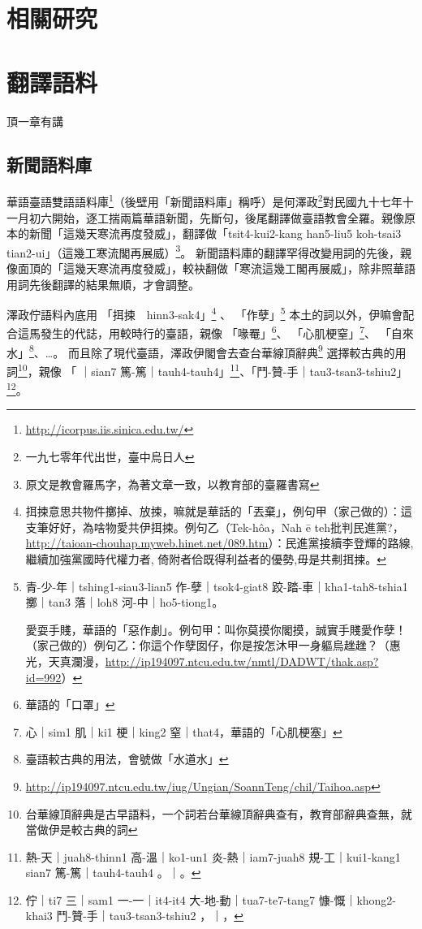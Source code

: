 \documentclass[final,oneside,onecolumn,12pt,a4paper]{book}%
\begin{document}
\chapter{相關研究}
\label{章：相關研究}


\chapter{翻譯語料}
\label{章：翻譯語料}

頂一章有講

\section{新聞語料庫}
\label{節：新聞語料庫}
華語臺語雙語語料庫\footnote{\url{http://icorpus.iis.sinica.edu.tw/}}（後壁用「新聞語料庫」稱呼）是何澤政\footnote{一九七零年代出世，臺中烏日人}對民國九十七年十一月初六開始，逐工揣兩篇華語新聞，先斷句，後尾翻譯做臺語教會全羅。親像原本的新聞「這幾天寒流再度發威」，翻譯做「tsit4-kui2-kang han5-liu5 koh-tsai3 tian2-ui」（這幾工寒流閣再展威）\footnote{原文是教會羅馬字，為著文章一致，以教育部的臺羅書寫}。
新聞語料庫的翻譯罕得改變用詞的先後，親像面頂的「這幾天寒流再度發威」，較袂翻做「寒流這幾工閣再展威」，除非照華語用詞先後翻譯的結果無順，才會調整。

澤政佇語料內底用
「挕捒　hinn3-sak4」\footnote{挕捒意思共物件擲掉、放捒，嘛就是華話的「丟棄」，例句甲（家己做的）：這支筆好好，為啥物愛共伊挕捒。例句乙（Tek-hôa，Nah ē teh批判民進黨?，\url{http://taioan-chouhap.myweb.hinet.net/089.htm}）：民進黨接續李登輝的路線, 繼續加強黨國時代權力者, 倚附者佮既得利益者的優勢,毋是共刜挕捒。}
、
「作孽」\footnote{
青-少-年｜tshing1-siau3-lian5 作-孽｜tsok4-giat8 跤-踏-車｜kha1-tah8-tshia1 擲｜tan3 落｜loh8 河-中｜ho5-tiong1。

愛耍手賤，華語的「惡作劇」。例句甲：叫你莫摸你閣摸，誠實手賤愛作孽！（家己做的）例句乙：你這个作孽囡仔，你是按怎沐甲一身軀烏趖趖？（惠光，天真瀾漫，\url{http://ip194097.ntcu.edu.tw/nmtl/DADWT/thak.asp?id=992}）}
本土的詞以外，伊嘛會配合這馬發生的代誌，用較時行的臺語，親像
「喙罨」\footnote{華語的「口罩」}、
「心肌梗窒」\footnote{心｜sim1 肌｜ki1 梗｜king2 窒｜that4，華語的「心肌梗塞」}、
「自來水」\footnote{臺語較古典的用法，會號做「水道水」}、…。
而且除了現代臺語，澤政伊閣會去查台華線頂辭典\footnote{\url{http://ip194097.ntcu.edu.tw/iug/Ungian/SoannTeng/chil/Taihoa.asp}}
選擇較古典的用詞\footnote{台華線頂辭典是古早語料，一个詞若台華線頂辭典查有，教育部辭典查無，就當做伊是較古典的詞}，親像
「𤺪｜sian7 篤-篤｜tauh4-tauh4」\footnote{熱-天｜juah8-thinn1 高-溫｜ko1-un1 炎-熱｜iam7-juah8 規-工｜kui1-kang1 𤺪｜sian7 篤-篤｜tauh4-tauh4 。｜。}、「鬥-贊-手｜tau3-tsan3-tshiu2」\footnote{佇｜ti7 三｜sam1 一-一｜it4-it4 大-地-動｜tua7-te7-tang7 慷-慨｜khong2-khai3 鬥-贊-手｜tau3-tsan3-tshiu2 ，｜，}。
\end{document}
